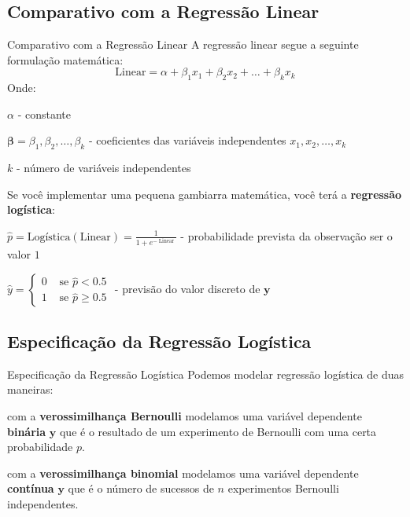 \subsection{Comparativo com a Regressão Linear}
\begin{frame}{Comparativo com a Regressão Linear}
    A regressão linear segue a seguinte formulação matemática:
    \small
    $$
    \text{Linear} = \alpha + \beta_1 x_1 + \beta_2 x_2 + \dots + \beta_k x_k
    $$
    Onde:
    \begin{vfilleditems}
        \item \small $\alpha$ - constante
        \item \small $\boldsymbol{\beta} = \beta_1, \beta_2, \dots, \beta_k$ - coeficientes das variáveis independentes $x_1, x_2, \dots, x_k$
        \item \small $k$ - número de variáveis independentes
    \end{vfilleditems}
    Se você implementar uma pequena gambiarra matemática, você terá a \textbf{regressão logística}:
    \begin{vfilleditems}
        \item \small $\hat{p} = \text{Logística}(\text{Linear}) = \frac{1}{1 + e^{-\operatorname{Linear}}}$ - probabilidade prevista da observação ser o valor $1$
        \item \small $\hat{y} = \begin{cases} 0 & \text { se } \hat{p} < 0.5 \\ 1 & \text { se } \hat{p} \geq 0.5 \end{cases}$ - previsão do valor discreto de $\boldsymbol{y}$
    \end{vfilleditems}
\end{frame}

\subsection{Especificação da Regressão Logística}
\begin{frame}{Especificação da Regressão Logística}
    Podemos modelar regressão logística de duas maneiras:
    \begin{vfilleditems}
        \item com a \textbf{verossimilhança Bernoulli} modelamos uma variável dependente
        \textbf{binária} $\boldsymbol{y}$ que é o resultado de um experimento de
        Bernoulli com uma certa probabilidade $p$.
        \item com a \textbf{verossimilhança binomial} modelamos uma variável dependente
        \textbf{contínua} $\boldsymbol{y}$ que é o número de sucessos de $n$
        experimentos Bernoulli independentes.
    \end{vfilleditems}
\end{frame}

